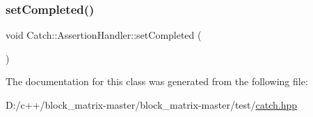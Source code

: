 \subsubsection{\texorpdfstring{set\+Completed()}{setCompleted()}}
{\footnotesize\ttfamily void Catch\+::\+Assertion\+Handler\+::set\+Completed (\begin{DoxyParamCaption}{ }\end{DoxyParamCaption})}



The documentation for this class was generated from the following file\+:\begin{DoxyCompactItemize}
\item 
D\+:/c++/block\+\_\+matrix-\/master/block\+\_\+matrix-\/master/test/\mbox{\hyperlink{catch_8hpp}{catch.\+hpp}}\end{DoxyCompactItemize}
